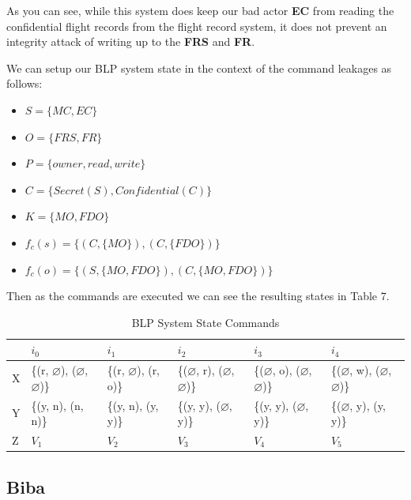 \documentclass[10pt,journal,compsoc]{IEEEtran}
\begin{document}
As you can see, while this system does keep our bad actor \textbf{EC} from reading the confidential flight records from the flight record system, it does not prevent an integrity attack of writing up to the \textbf{FRS} and \textbf{FR}.

We can setup our BLP system state in the context of the command leakages as follows:

\begin{itemize}
  \item $S = \{MC, EC\}$
  \item $O = \{FRS, FR\}$
  \item $P = \{owner, read, write\}$
  \item $C = \{Secret (S), Confidential (C)\}$
  \item $K = \{MO, FDO\}$
  \item $f_c(s) = \{(C, \{MO\}), (C, \{FDO\})\}$
  \item $f_c(o) = \{(S, \{MO, FDO\}), (C, \{MO, FDO\})\}$
\end{itemize}

Then as the commands are executed we can see the resulting states in Table 7. 

\begin{table}[]
  \centering
  \caption{BLP System State Commands}
  \label{tab:blp-commands}
    \begin{tabular}{llllll}
      \hline
      \textbf{} & \textbf{$i_0$}                                      & \textbf{$i_1$}                & \textbf{$i_2$}        & \textbf{$i_3$}        & \textbf{$i_4$}        \\
      \hline
      X         & \{(r, $\varnothing$), ($\varnothing$, $\varnothing$)\} & \{(r, $\varnothing$), (r, o)\} & \{($\varnothing$, r), ($\varnothing$, $\varnothing$)\} & \{($\varnothing$, o), ($\varnothing$, $\varnothing$)\} & \{($\varnothing$, w), ($\varnothing$, $\varnothing$)\} \\
      Y         & \{(y, n), (n, n)\}                                  & \{(y, n), (y, y)\}            & \{(y, y), ($\varnothing$, y)\}   & \{(y, y), ($\varnothing$, y)\}   & \{($\varnothing$, y), (y, y)\}   \\
      Z         & $V_1$                                               & $V_2$                         & $V_3$                 & $V_4$                 & $V_5$                
      \end{tabular}
  \end{table}

\subsection{Biba}
\end{document}
